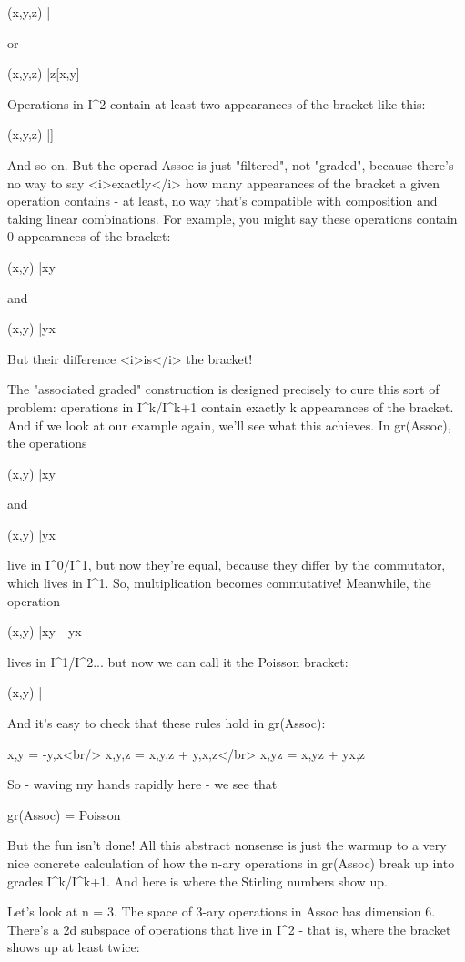 (x,y,z) |\to  [xy,z]

or 

(x,y,z) |\to  z[x,y]

Operations in I^{2} contain at least two appearances of the
bracket like this:

(x,y,z) |\to  [x,[y,z]]

And so on.  But the operad Assoc is just "filtered", not
"graded", because there's no way to say <i>exactly</i> how
many appearances of the bracket a given operation contains - at least,
no way that's compatible with composition and taking linear
combinations.  For example, you might say these operations contain 0
appearances of the bracket:

(x,y) |\to  xy 

and

(x,y) |\to  yx

But their difference <i>is</i> the bracket!

The "associated graded" construction is designed precisely
to cure this sort of problem: operations in
I^{k}/I^{k+1} contain exactly k appearances of the
bracket.  And if we look at our example again, we'll see what this
achieves.  In gr(Assoc), the operations

(x,y) |\to  xy 

and

(x,y) |\to  yx

live in I^{0}/I^{1}, but now they're equal, because
they differ by the commutator, which lives in I^{1}.  So,
multiplication becomes commutative!  Meanwhile, the operation

(x,y) |\to  xy - yx

lives in I^{1}/I^{2}... but now we can call it the
Poisson bracket:

(x,y) |

And it's easy to check that these rules hold in gr(Assoc):

{x,y} = -{y,x}<br/>
{x,{y,z}} = {{x,y},z} + {y,{x,z}}</br>
{x,yz} = {x,y}z + y{x,z}

So - waving my hands rapidly here - we see that

gr(Assoc) = Poisson

But the fun isn't done!  All this abstract nonsense is just the warmup
to a very nice concrete calculation of how the n-ary operations in
gr(Assoc) break up into grades I^{k}/I^{k+1}.  And
here is where the Stirling numbers show up.

Let's look at n = 3.  The space of 3-ary operations in Assoc has
dimension 6.  There's a 2d subspace of operations that live in
I^{2} - that is, where the bracket shows up at least twice:

